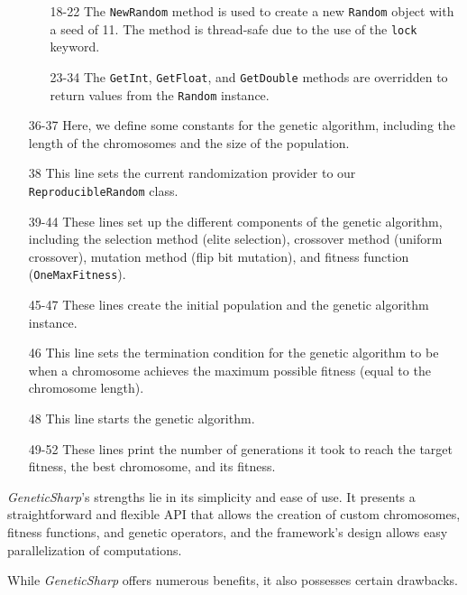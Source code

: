 \begin{enumerate}
\begin{enumerate}
        \item[18-22] The \texttt{NewRandom} method is used to 
          create a new \texttt{Random} object with a seed of 11.
          The method is thread-safe due to the use of the 
          \texttt{lock} keyword.
        \item[23-34] The \texttt{GetInt}, 
          \texttt{GetFloat}, and \texttt{GetDouble} 
          methods are overridden to return values from the 
          \texttt{Random} instance.
      \end{enumerate}
    \item[36-37] Here, we define some constants for the genetic algorithm, 
      including the length of the chromosomes and the size of the population.
    \item[38] This line sets the current randomization provider to our 
      \texttt{ReproducibleRandom} class.
    \item[39-44] These lines set up the different components of the genetic 
      algorithm, including the selection method (elite selection), crossover 
      method (uniform crossover), mutation method (flip bit mutation), and 
      fitness function (\texttt{OneMaxFitness}).
    \item[45-47] These lines create the initial population and the genetic 
      algorithm instance.
    \item[46] This line sets the termination condition for the genetic 
      algorithm to be when a chromosome achieves the maximum possible fitness 
      (equal to the chromosome length).
    \item[48] This line starts the genetic algorithm.
    \item[49-52] These lines print the number of generations it took to reach the target fitness, the best chromosome, and its fitness.
  \end{enumerate}

  \textit{GeneticSharp}'s strengths lie in its simplicity and ease of use.
  It presents a straightforward and flexible API that allows the creation of 
  custom chromosomes, fitness functions, and genetic operators, and the 
  framework's design allows easy parallelization of computations.

  While \textit{GeneticSharp} offers numerous benefits, it also possesses 
  certain drawbacks.

